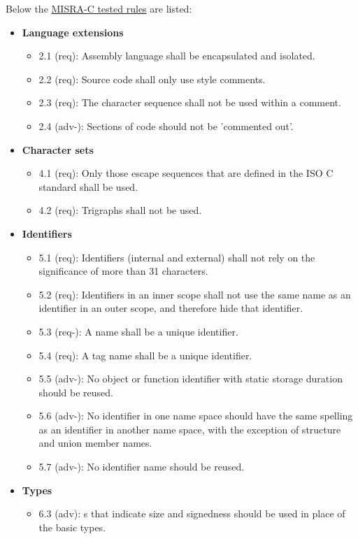 Below the \underline{MISRA-C tested rules} are listed:
\begin{itemize}
\item \textbf{Language extensions}
\begin{itemize}
\item 2.1 (req): Assembly language shall be encapsulated and isolated.
\item 2.2 (req): Source code shall only use  style comments.
\item 2.3 (req): The character sequence \inl{/*} shall not be used within a comment.
\item 2.4 (adv-): Sections of code should not be 'commented out'.
\end{itemize}
\item \textbf{Character sets}
\begin{itemize}
\item 4.1 (req): Only those escape sequences that are defined in the ISO C standard shall be used.
\item 4.2 (req): Trigraphs shall not be used.
\end{itemize}
\item \textbf{Identifiers}
\begin{itemize}
\item 5.1 (req): Identifiers (internal and external) shall not rely on the significance of more than 31 characters.
\item 5.2 (req): Identifiers in an inner scope shall not use the same name as an identifier in an outer scope, and therefore hide that identifier.
\item 5.3 (req-): A  name shall be a unique identifier.
\item 5.4 (req): A tag name shall be a unique identifier.
\item 5.5 (adv-): No object or function identifier with static storage duration should be reused.
\item 5.6 (adv-): No identifier in one name space should have the same spelling as an identifier in another name space, with the exception of structure and union member names.
\item 5.7 (adv-): No identifier name should be reused.
\end{itemize}
\item \textbf{Types}
\begin{itemize}
\item 6.3 (adv): s that indicate size and signedness should be used in place of the basic types.

\end{itemize}
\end{itemize}
